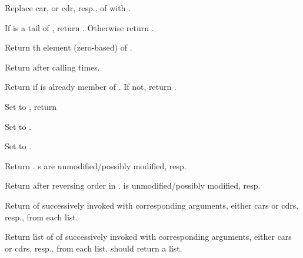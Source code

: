 \begin{LIST}{1cm}
  Replace car, or cdr, resp., of  with .

  If  is a tail of , return . Otherwise return .

   Return th element (zero-based) of .

   Return  after calling   times.

    Return  if  is
  already member of . If not, return .

  Set  to , return

   Set  to
  .

   Set  to
  .

  Return . s are unmodified/possibly
  modified, resp.

  Return  after reversing order in
  .  is unmodified/possibly
  modified, resp.

  Return  of  successively
  invoked with corresponding arguments, either cars or cdrs, resp.,
  from each list. 

  Return list of 
   of
   successively invoked with corresponding arguments,
  either cars or cdrs, resp.,
  from each list.  should return a list.


\end{LIST}
